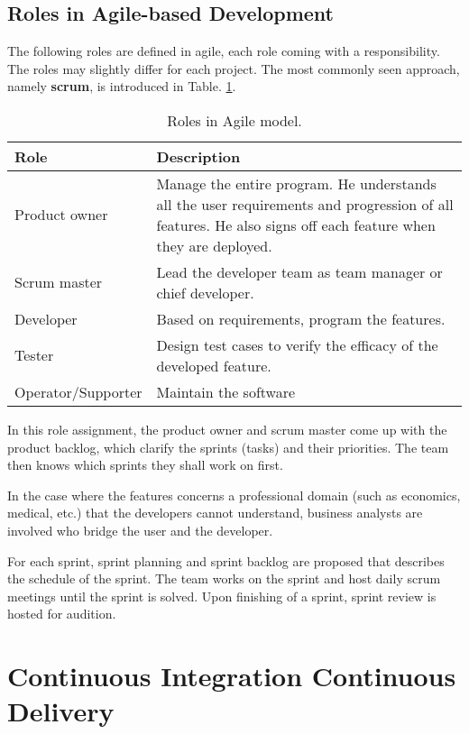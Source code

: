\subsection{Roles in Agile-based Development}

The following roles are defined in agile, each role coming with a responsibility. The roles may slightly differ for each project. The most commonly seen approach, namely \textbf{scrum}, is introduced in Table. \ref{ch:cicd:tab:agilerole}.
\begin{table}[htbp]
	\centering
	\caption{Roles in Agile model.} \label{ch:cicd:tab:agilerole}
	\begin{tabularx}{\textwidth}{lX}
		\hline
		Role & Description \\
		\hline
		Product owner & Manage the entire program. He understands all the user requirements and progression of all features. He also signs off each feature when they are deployed. \\ \hdashline
		Scrum master & Lead the developer team as team manager or chief developer. \\ \hdashline
		Developer & Based on requirements, program the features. \\ \hdashline
		Tester & Design test cases to verify the efficacy of the developed feature. \\ \hdashline
		Operator/Supporter & Maintain the software \\
		\hline
	\end{tabularx}
\end{table}

In this role assignment, the product owner and scrum master come up with the product backlog, which clarify the sprints (tasks) and their priorities. The team then knows which sprints they shall work on first.

In the case where the features concerns a professional domain (such as economics, medical, etc.) that the developers cannot understand, business analysts are involved who bridge the user and the developer.

For each sprint, sprint planning and sprint backlog are proposed that describes the schedule of the sprint. The team works on the sprint and host daily scrum meetings until the sprint is solved. Upon finishing of a sprint, sprint review is hosted for audition.

\section{Continuous Integration Continuous Delivery}

